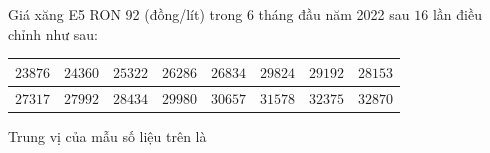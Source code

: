 \begin{ex}
Giá xăng E5 RON 92 (đồng/lít) trong $6$ tháng đầu năm 2022 sau $16$ lần điều chỉnh như sau:
\begin{center}
\begin{tabular}{|c|c|c|c|c|c|c|c|}\hline
$23876$ & $24360$ & $25322$ & $26286$ & $26834$ & $29824$ & $29192$ & $28153$\\\hline
$27317$ & $27992$ & $28434$ & $29980$ & $30657$ & $31578$ & $32375$ & $32870$\\\hline
\end{tabular}
\end{center}
Trung vị của mẫu số liệu trên là
\end{ex}

